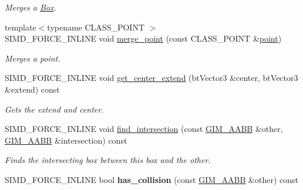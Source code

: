 \begin{DoxyCompactItemize}
\begin{DoxyCompactList}\small\item\em Merges a \hyperlink{class_box}{Box}. \end{DoxyCompactList}\item 
\hypertarget{class_g_i_m___a_a_b_b_a982f35ef44698918555a84419f0bbabf}{{\footnotesize template$<$typename C\+L\+A\+S\+S\+\_\+\+P\+O\+I\+N\+T $>$ }\\S\+I\+M\+D\+\_\+\+F\+O\+R\+C\+E\+\_\+\+I\+N\+L\+I\+N\+E void \hyperlink{class_g_i_m___a_a_b_b_a982f35ef44698918555a84419f0bbabf}{merge\+\_\+point} (const C\+L\+A\+S\+S\+\_\+\+P\+O\+I\+N\+T \&\hyperlink{structpoint}{point})}\label{class_g_i_m___a_a_b_b_a982f35ef44698918555a84419f0bbabf}

\begin{DoxyCompactList}\small\item\em Merges a point. \end{DoxyCompactList}\item 
\hypertarget{class_g_i_m___a_a_b_b_a75140c87ffca65c98ae0391161768ecf}{S\+I\+M\+D\+\_\+\+F\+O\+R\+C\+E\+\_\+\+I\+N\+L\+I\+N\+E void \hyperlink{class_g_i_m___a_a_b_b_a75140c87ffca65c98ae0391161768ecf}{get\+\_\+center\+\_\+extend} (bt\+Vector3 \&center, bt\+Vector3 \&extend) const }\label{class_g_i_m___a_a_b_b_a75140c87ffca65c98ae0391161768ecf}

\begin{DoxyCompactList}\small\item\em Gets the extend and center. \end{DoxyCompactList}\item 
\hypertarget{class_g_i_m___a_a_b_b_a61a5dc7c0f802b2f4ef782b6bed04938}{S\+I\+M\+D\+\_\+\+F\+O\+R\+C\+E\+\_\+\+I\+N\+L\+I\+N\+E void \hyperlink{class_g_i_m___a_a_b_b_a61a5dc7c0f802b2f4ef782b6bed04938}{find\+\_\+intersection} (const \hyperlink{class_g_i_m___a_a_b_b}{G\+I\+M\+\_\+\+A\+A\+B\+B} \&other, \hyperlink{class_g_i_m___a_a_b_b}{G\+I\+M\+\_\+\+A\+A\+B\+B} \&intersection) const }\label{class_g_i_m___a_a_b_b_a61a5dc7c0f802b2f4ef782b6bed04938}

\begin{DoxyCompactList}\small\item\em Finds the intersecting box between this box and the other. \end{DoxyCompactList}\item 
\hypertarget{class_g_i_m___a_a_b_b_ab28c9e74022cc39870be1befdd0fde97}{S\+I\+M\+D\+\_\+\+F\+O\+R\+C\+E\+\_\+\+I\+N\+L\+I\+N\+E bool {\bfseries has\+\_\+collision} (const \hyperlink{class_g_i_m___a_a_b_b}{G\+I\+M\+\_\+\+A\+A\+B\+B} \&other) const }\label{class_g_i_m___a_a_b_b_ab28c9e74022cc39870be1befdd0fde97}


\end{DoxyCompactItemize}
